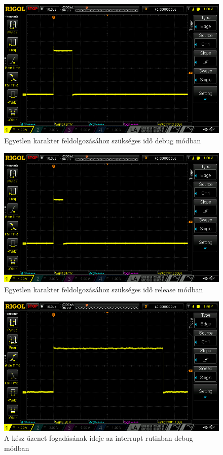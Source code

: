 \begin{figure}
  \centering \includegraphics[width=150mm,
    keepaspectratio]{figures/ch3/osc_single_char_debug.png}
  \caption{Egyetlen karakter feldolgozásához szükséges idő debug módban}
  \label{fig:char_debug}
\end{figure}
\begin{figure}
  \centering \includegraphics[width=150mm,
    keepaspectratio]{figures/ch3/osc_single_char_release.png}
  \caption{Egyetlen karakter feldolgozásához szükséges idő release módban}
  \label{fig:char_release}
\end{figure}
\begin{figure}
  \centering \includegraphics[width=150mm,
    keepaspectratio]{figures/ch3/osc_complete_message_debug.png}
  \caption{A kész üzenet fogadásának ideje az interrupt rutinban debug módban}
  \label{fig:msg_debug}
\end{figure}

